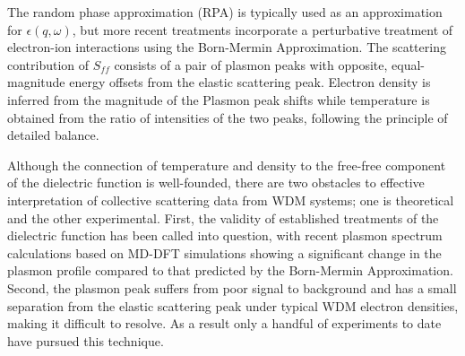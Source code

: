 \documentclass [11pt, proquest, article] {uwthesis}[2016/11/22]
\begin{document}
The random phase approximation (RPA) is typically used as an approximation for $\epsilon(q, \omega)$, but more recent treatments incorporate a perturbative treatment of electron-ion interactions using the Born-Mermin Approximation. \cite{bohm1953collective, mermin1970lindhard} 
The scattering contribution of $S_{ff}$ consists of a pair of plasmon peaks with opposite, equal-magnitude energy offsets from the elastic scattering peak. Electron density is inferred from the magnitude of the Plasmon peak shifts while temperature is obtained from the ratio of intensities of the two peaks, following the principle of detailed balance. \cite{glenzer2007observations, lee2009x}

Although the connection of temperature and density to the free-free component of the dielectric function is well-founded, there are two obstacles to effective interpretation of collective scattering data from WDM systems; one is theoretical and the other experimental. First, the validity of established treatments of the dielectric function has been called into question, with recent plasmon spectrum calculations based on MD-DFT simulations showing a significant change in the plasmon profile compared to that predicted by the Born-Mermin Approximation. \cite{mattern2014compton, plagemann2012dynamic} Second, the plasmon peak suffers from poor signal to background and has a small separation from the elastic scattering peak under typical WDM electron densities, making it difficult to resolve. As a result only a handful of experiments to date have pursued this technique. 
\end{document}
